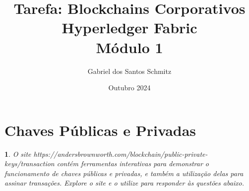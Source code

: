 \documentclass[letterpaper,11pt,leqno]{article}
\newtheorem{problem}{\refstepcounter{problemcount}{Problema}}
\begin{document}
\title{Tarefa: Blockchains Corporativos\\ Hyperledger Fabric\\ Módulo 1}

\author{Gabriel dos Santos Schmitz}

\date{Outubro 2024}

\begin{titlepage}

	\maketitle

\end{titlepage}

\section{Chaves Públicas e Privadas}

\begin{problem}
O site https://andersbrownworth.com/blockchain/public-private-keys/transaction
contém ferramentas interativas para demonstrar o funcionamento de chaves
públicas e privadas, e também a utilização delas para assinar transações.
Explore o site e o utilize para responder às questões abaixo.
\end{problem}
\end{document}
